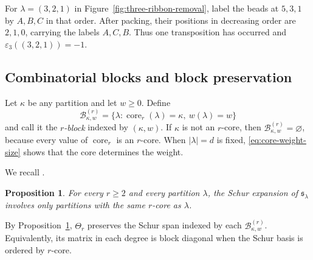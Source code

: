 \documentclass[12pt,reqno,a4paper]{amsart}
\numberwithin{equation}{section}
\numberwithin{figure}{section}
\theoremstyle{plain}
\newtheorem{proposition}[theorem]{Proposition}
\theoremstyle{definition}
\newcommand{\eps}{\varepsilon}
\begin{document}
For $\lambda=(3,2,1)$ in Figure~\ref{fig:three-ribbon-removal},
label the beads at $5,3,1$ by $A,B,C$ in that order.  After packing, their positions in decreasing order are
$2,1,0$, carrying the labels $A,C,B$.  Thus one transposition has
occurred and $\eps_3((3,2,1))=-1$.

\subsection{Combinatorial blocks and block preservation}
\label{subsec:combinatorial-blocks}

Let $\kappa$ be any partition and let $w\geq0$.  Define
\[
\mathcal B_{\kappa,w}^{(r)}
=\{\lambda:\operatorname{core}_r(\lambda)=\kappa,
 \ w(\lambda)=w\}
\]
and call it the \emph{$r$-block} indexed by $(\kappa,w)$.  If $\kappa$
is not an $r$-core, then $\mathcal B_{\kappa,w}^{(r)}=\varnothing$,
because every value of $\operatorname{core}_r$ is an $r$-core.  When
$|\lambda|=d$ is fixed,
\eqref{eq:core-weight-size} shows that the core determines the weight.

We recall \cite[Corollary~2.8, p.~586]{Walker}.

\begin{proposition}\label{prop:block-preservation}
For every $r\geq2$ and every partition $\lambda$, the Schur expansion
of $\mathfrak{s}_\lambda$ involves only partitions with the same $r$-core as
$\lambda$.
\end{proposition}

By Proposition~\ref{prop:block-preservation}, $\Theta_r$ preserves
the Schur span indexed by each $\mathcal B_{\kappa,w}^{(r)}$.
Equivalently, its matrix in each degree is block diagonal when the
Schur basis is ordered by $r$-core.
\end{document}
